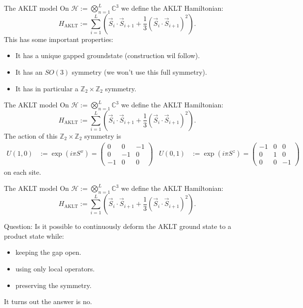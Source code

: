 \documentclass{beamer}
\newcommand{\HH}{\mathcal{H}}
\newcommand{\CC}{\mathbb{C}}
\newcommand{\ZZ}{\mathbb{Z}}
\begin{document}
\begin{frame}{The AKLT model}
On $\HH:=\bigotimes_{n=1}^L\CC^3$ we define the AKLT Hamiltonian: 
\begin{equation*}
H_{\text{AKLT}}:= \sum_{i=1}^L\left(\vec{S}_i\cdot \vec{S}_{i+1}+\frac{1}{3}(\vec{S}_i\cdot \vec{S}_{i+1})^2\right).
\end{equation*}
\pause
This has some important properties:
\begin{itemize}
\item It has a unique gapped groundstate (construction wil follow).
\pause
\item It has an $SO(3)$ symmetry (we won't use this full symmetry).
\pause
\item It has in particular a $\ZZ_2\times \ZZ_2$ symmetry.
\end{itemize}
\end{frame}

\begin{frame}{The AKLT model}
On $\HH:=\bigotimes_{n=1}^L\CC^3$ we define the AKLT Hamiltonian: 
\begin{equation*}
H_{\text{AKLT}}:= \sum_{i=1}^L\left(\vec{S}_i\cdot \vec{S}_{i+1}+\frac{1}{3}(\vec{S}_i\cdot \vec{S}_{i+1})^2\right).
\end{equation*}
The action of this $\ZZ_2\times \ZZ_2$ symmetry is
\begin{align*}
U(1,0)&:=\exp(i\pi S^x)=\begin{pmatrix}0&0&-1\\0&-1&0\\-1&0&0\end{pmatrix}&U(0,1)&:=\exp(i\pi S^z)=\begin{pmatrix}-1&0&0\\0&1&0\\0&0&-1\end{pmatrix}
\end{align*}
on each site.
\end{frame}

\begin{frame}{The AKLT model}
On $\HH:=\bigotimes_{n=1}^L\CC^3$ we define the AKLT Hamiltonian: 
\begin{equation*}
H_{\text{AKLT}}:= \sum_{i=1}^L\left(\vec{S}_i\cdot \vec{S}_{i+1}+\frac{1}{3}(\vec{S}_i\cdot \vec{S}_{i+1})^2\right).
\end{equation*}
\begin{block}{Question:}
Is it possible to continuously deform the AKLT ground state to a product state while:
\begin{itemize}
\item keeping the gap open.
\item using only local operators.
\item preserving the symmetry.
\end{itemize}
\end{block}
\pause
It turns out the answer is no.
\end{frame}
\end{document}
